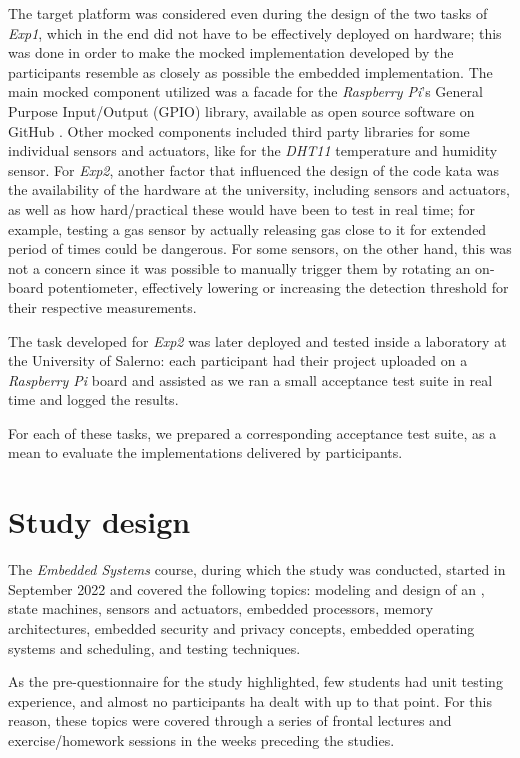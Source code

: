 The target platform was considered even during the design of the two tasks of \textit{Exp1}, which in the end did not have to be effectively deployed on hardware; this was done in order to make the mocked implementation developed by the participants resemble as closely as possible the embedded implementation. The main mocked component utilized was a facade for the \textit{Raspberry Pi}'s General Purpose Input/Output (GPIO) library, available as open source software on GitHub \cite{GPIOMock}. Other mocked components included third party libraries for some individual sensors and actuators, like for the \textit{DHT11} temperature and humidity sensor.
For \textit{Exp2}, another factor that influenced the design of the code kata was the availability of the hardware at the university, including sensors and actuators, as well as how hard/practical these would have been to test in real time; for example, testing a gas sensor by actually releasing gas close to it for extended period of times could be dangerous. For some sensors, on the other hand, this was not a concern since it was possible to manually trigger them by rotating an on-board potentiometer, effectively lowering or increasing the detection threshold for their respective measurements.

The task developed for \textit{Exp2} was later deployed and tested inside a laboratory at the University of Salerno: each participant had their project uploaded on a \textit{Raspberry Pi} board and assisted as we ran a small acceptance test suite in real time and logged the results. 

For each of these tasks, we prepared a corresponding acceptance test suite, as a mean to evaluate the implementations delivered by participants.


\section{Study design}
The \textit{Embedded Systems} course, during which the study was conducted, started in September 2022 and covered the following topics: modeling and design of an \es, state machines, sensors and actuators, embedded processors, memory architectures, embedded security and privacy concepts, embedded operating systems and scheduling, and \es testing techniques.

As the pre-questionnaire for the study highlighted, few students had unit testing experience, and almost no participants ha dealt with \tdd up to that point. For this reason, these topics were covered through a series of frontal lectures and exercise/homework sessions in the weeks preceding the studies.

